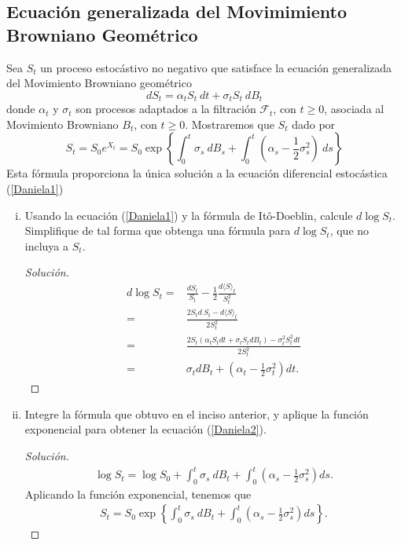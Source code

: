 \documentclass[11pt,notitlepage]{article}
\begin{document}
\subsection{Ecuación generalizada del Movimimiento Browniano Geométrico}
Sea \(S_t\) un proceso estocástivo no negativo que satisface la ecuación generalizada del Movimiento Browniano geométrico 
\begin{equation} \label{Daniela1}
    dS_t= \alpha_{t}S_t~dt+\sigma_{t}S_t~
    dB_t
\end{equation}
donde \(\alpha_{t}\) y \(\sigma_{t}\) son procesos adaptados a la filtración \(\mathcal{F}_t\), con \(t \geq 0\), asociada al Movimiento Browniano \(B_t\), con \(t \geq 0\). Mostraremos que \(S_t\) dado por
\begin{equation} \label{Daniela2}
   S_t=S_0e^{X_t} =S_0 \exp\left\{\int_0^t \sigma_{s}~dB_s+\int_0^t\left(\alpha_{s}-\frac{1}{2}\sigma^{2}_{s}\right)~ds\right\}
\end{equation}
Esta fórmula proporciona la única solución a la ecuación diferencial estocástica (\ref{Daniela1})

\begin{enumerate}[i.]
    \item Usando la ecuación (\ref{Daniela1}) y la fórmula de Itô-Doeblin, calcule \(d\log S_t\). Simplifique de tal forma que obtenga una fórmula para \(d\log S_t\), que no incluya a \(S_t\).
    \begin{proof}[Solución]
    \begin{align*}
        d\log S_t =& \frac{dS_t}{S_t}-\frac{1}{2}\frac{d\langle S\rangle_t}{S^2_t}\\
        =& \frac{2S_td~S_t-d\langle S\rangle_t}{2S^2_t}\\
        =&\frac{2S_t\left(\alpha_{t}S_tdt+\sigma_{t}S_tdB_t\right)-\sigma^{2}_{t}S^2_tdt}{2S_t^2}\\
        =& \sigma_{t}dB_t+\left(\alpha_{t}-\frac{1}{2}\sigma^{2}_{t}\right)dt.
    \end{align*}
    \end{proof}
    \item Integre la fórmula que obtuvo en el inciso anterior, y aplique la función exponencial para obtener la ecuación (\ref{Daniela2}).
    \begin{proof}[Solución]
   \begin{align*}
        \log S_t= \log S_0+\int_0^t \sigma_{s} ~dB_t+\int_0^t\left(\alpha_{s}-\frac{1}{2}\sigma^{2}_{s}\right)ds.
   \end{align*}
   Aplicando la función exponencial, tenemos que 
   \begin{align*}
      S_t= S_0 \exp\left\{\int_0^t\sigma_{s}~dB_t+\int_0^t\left(\alpha_{s}-\frac{1}{2}\sigma^{2}_{s}\right)ds\right\}.
   \end{align*}
    \end{proof}
\end{enumerate}
\end{document}
